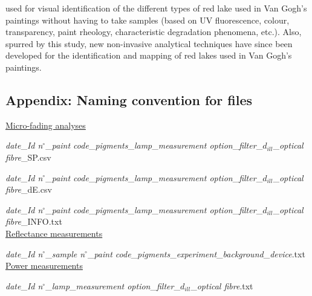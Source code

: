 \begin{appendices}
used for visual identification of the different types of red lake used in Van Gogh’s paintings without having to take samples (based on UV fluorescence, colour, transparency, paint rheology, characteristic degradation phenomena, etc.). Also, spurred by this study, new non-invasive analytical techniques have since been developed for the identification and mapping of red lakes used in Van Gogh’s paintings. 

\end{appendices}





\begin{appendices}
  
\renewcommand{\thesection}{3.\arabic{section}}



\newpage
\section[\hspace{0.3cm}Naming conventions]{ Appendix: Naming convention for files}
\label{app:ch3_naming_conventions}

\underline{Micro-fading analyses}


\textit{date}\_\textit{Id n$^\circ$}\_\textit{paint code}\_\textit{pigments}\_\textit{lamp}\_\textit{measurement option}\_\textit{filter}\_$d_{ill}$\_\textit{optical fibre}\_SP.csv

\textit{date}\_\textit{Id n$^\circ$}\_\textit{paint code}\_\textit{pigments}\_\textit{lamp}\_\textit{measurement option}\_\textit{filter}\_$d_{ill}$\_\textit{optical fibre}\_dE.csv

\textit{date}\_\textit{Id n$^\circ$}\_\textit{paint code}\_\textit{pigments}\_\textit{lamp}\_\textit{measurement option}\_\textit{filter}\_$d_{ill}$\_\textit{optical fibre}\_INFO.txt\\

\underline{Reflectance measurements}

\textit{date}\_\textit{Id n$^\circ$}\_\textit{sample n$^\circ$}\_\textit{paint code}\_\textit{pigments}\_\textit{experiment}\_\textit{background}\_\textit{device}.txt\\

\underline{Power measurements}

\textit{date}\_\textit{Id n$^\circ$}\_\textit{lamp}\_\textit{measurement option}\_\textit{filter}\_$d_{ill}$\_\textit{optical fibre}.txt\\



\end{appendices}
